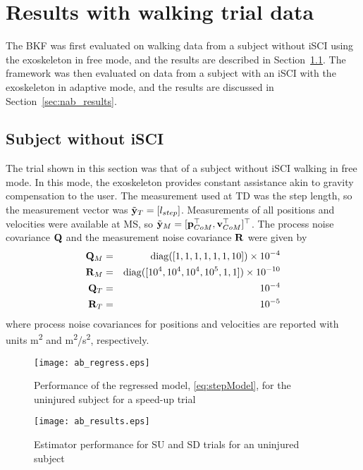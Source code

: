 \section{Results with walking trial data}\label{sec:bkf_results}

The BKF was first evaluated on walking data from a subject without iSCI using the exoskeleton in free mode, and the results are described in Section~\ref{sec:ab_results}. The framework was then evaluated on data from a subject with an iSCI with the exoskeleton in adaptive mode, and the results are discussed in Section~\ref{sec:nab_results}.

\subsection{Subject without iSCI}\label{sec:ab_results}
The trial shown in this section was that of a subject without iSCI walking in free mode. In this mode, the exoskeleton provides constant assistance akin to gravity compensation to the user. The measurement used at TD was the step length, so the measurement vector was $ \tilde{\mathbf{y}}_{T} = [l_{step}] $. Measurements of all positions and velocities were available at MS, so $ \tilde{\mathbf{y}}_{M} = [\mathbf{p}_{CoM}^{\top} ,\mathbf{v}_{CoM}^{\top}]^{\top} $. The process noise covariance $ \mathbf{Q} $ and the measurement noise covariance $ \mathbf{R} $ were given by
\begin{eqnarray}
	\Q_M &=& {\rm diag}([1 ,1 ,1 ,1 ,1 ,1 ,10]) \times 10^{-4} \\
	\R_M &=& {\rm diag}([10^{4} ,10^{4} ,10^{4} ,10^{5} ,1 ,1]) \times 10^{-10} \\ %
	\Q_T &=& 10^{-4} \\
	\R_T &=& 10^{-5} %
\end{eqnarray}
where process noise covariances for positions and velocities are reported with units m\textsuperscript{2} and m\textsuperscript{2}/s\textsuperscript{2}, respectively.

\begin{figure}
	\centering
	\texttt{[image: ab\_regress.eps]}
	\caption{Performance of the regressed model, \eqref{eq:stepModel}, for the uninjured subject for a speed-up trial} \label{fig:ab_regressor}
\end{figure}

\begin{figure}
	\centering
	\texttt{[image: ab\_results.eps]}
	\caption{Estimator performance for SU and SD trials for an uninjured subject} \label{fig:ab_results}
\end{figure}

